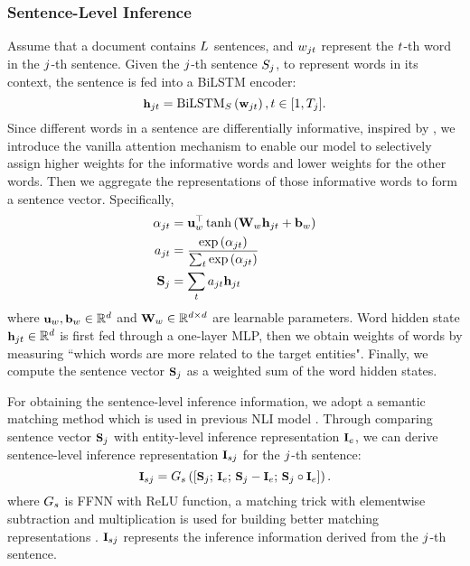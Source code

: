 \documentclass[runningheads]{llncs}
\begin{document}
\subsubsection{Sentence-Level Inference}
Assume that a document contains $\small L$ sentences, and
$\small w_{j t}$ represent the $\small t$-th word in the $\small j$-th sentence.
Given the $\small j$-th sentence $\small S_{j}$, to represent words in its context, the sentence is fed into a BiLSTM encoder:
\begin{equation}
\small
\textbf{h}_{j t}=\mathrm{BiLSTM}_{S}\left(\textbf{w}_{j t}\right), t \in[1, T_{j}].
\end{equation}
Since different words in a sentence are differentially informative, inspired by \cite{yang2016hierarchical}, we introduce the vanilla attention mechanism to enable our model to selectively assign higher weights for the informative words and lower weights for the other words.
Then we aggregate the representations of those informative words to form a sentence vector. Specifically,
\begin{align}
\small
\alpha_{j t}&=\textbf{u}_{w}^{\top} \tanh \left(\textbf{W}_{w} \textbf{h}_{j t}+\textbf{b}_{w}\right) \\
a_{j t}&=\frac{\exp \left(\alpha_{j t}\right)}{\sum_{t} \exp \left(\alpha_{j t}\right)} \\
\textbf{S}_{j}&=\sum_{t} a_{j t} \textbf{h}_{j t}
\end{align}
where $\small \textbf{u}_{w}, \textbf{b}_{w} \in \mathbb{R}^{d}$ and $\small \textbf{W}_{w} \in \mathbb{R}^{d \times d}$ are learnable parameters.
Word hidden state $\small \textbf{h}_{j t} \in \mathbb{R}^{d}$ is first fed through a one-layer MLP,
then we obtain weights of words by measuring ``which words are more related to the target entities".
Finally, we compute the sentence vector $\small \textbf{S}_{j}$ as a weighted sum of the word hidden states. 

For obtaining the sentence-level inference information, we adopt a semantic matching method which is used in previous NLI model \cite{chen2016enhanced}. Through comparing sentence vector $\small \textbf{S}_{j}$ with entity-level inference representation $\small \textbf{I}_{e}$, we can derive sentence-level inference representation $\small \textbf{I}_{sj}$ for the $\small j$-th sentence:
\begin{equation}
\small
\textbf{I}_{sj}=G_{s}\left(\left[\textbf{S}_{j} ; \, \textbf{I}_{e} ; \, \textbf{S}_{j}-\textbf{I}_{e} ; \, \textbf{S}_{j} \circ \textbf{I}_{e}\right]\right).
\end{equation}
where $\small G_{s}$ is FFNN with ReLU function, a matching trick with elementwise subtraction and multiplication is used for building better matching representations \cite{Mou2015NaturalLI}.
$\small \textbf{I}_{sj}$ represents the inference information derived from the $\small j$-th sentence.
\end{document}
